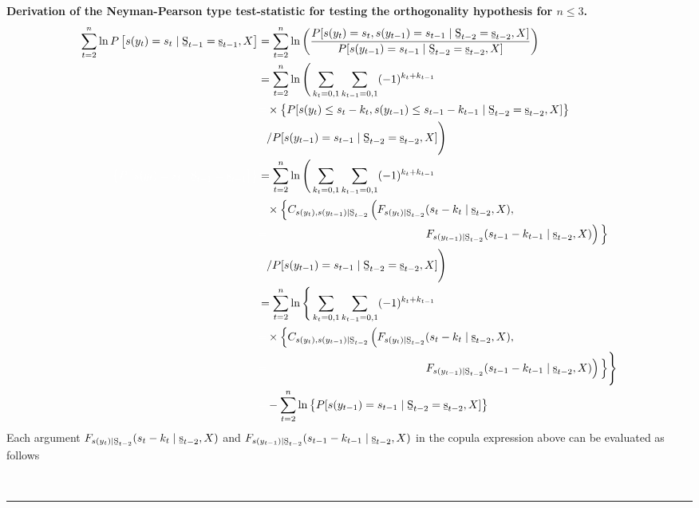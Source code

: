 \documentclass[harvard,11pt]{article}
\newenvironment{proof}[1][Proof]{\textbf{#1.} }{\  \rule{0.5em}{0.5em}}
\begin{document}
\begin{proof}[Derivation of the Neyman-Pearson type test-statistic for testing the orthogonality hypothesis for $n\leq 3$]
\begin{align*}
 \sum\limits_{t=2}^{n} \ln P\left[s(y_{t})=s_{t}\mid \text{\b{S}}_{t-1}=\text{\b{s}}_{t-1},X\right] &=\sum\limits_{t=2}^{n}\ln\left(\frac{P[s(y_t)=s_t,s(y_{t-1})=s_{t-1}\mid \text{\b{S}}%
_{t-2}=\text{\b{s}}%
_{t-2},X]}{P[s(y_{t-1})=s_{t-1}\mid \text{\b{S}}%
_{t-2}=\text{\b{s}}%
_{t-2},X]}\right)\\
&=\sum\limits_{t=2}^{n}\ln\Bigg(\sum\limits_{k_t=0,1}\sum\limits_{k_{t-1}=0,1}(-1)^{k_t+k_{t-1}}\\
&\textcolor{white}{=}\times\left\{P[s(y_t)\leq s_t-k_t,s(y_{t-1})\leq s_{t-1}-k_{t-1}\mid \text{\b{S}}%
_{t-2}=\text{\b{s}}_{t-2},X]\right\}\\
&\textcolor{white}{=}/P[s(y_{t-1})=s_{t-1}\mid \text{\b{S}}_{t-2}=\text{\b{s}}_{t-2},X]\Bigg)\\
\textcolor{white}{\left\{ P\left[s(y_{t})=s_{t}\mid \text{\b{S}}_{t-1}=\text{\b{s}}_{t-1}\right] \right\} }&=\sum\limits_{t=2}^{n}\ln\Bigg(\sum\limits_{k_t=0,1}\sum\limits_{k_{t-1}=0,1}(-1)^{k_t+k_{t-1}}\\
& \textcolor{white}{=}\times\Big\{C_{s(y_t),s(y_{t-1})\mid \text{\b{S}}%
_{t-2}}\left(F_{s(y_t)\mid \text{\b{S}}%
_{t-2} }(s_t-k_t\mid \text{\b{s}}%
_{t-2},X),\right.\\
& \textcolor{white}{=}\hspace{14em}\left.F_{s(y_{t-1})\mid \text{\b{S}}_{t-2}}(s_{t-1}-k_{t-1}\mid \text{\b{s}}_{t-2},X)\right)\Big\}\\
&\textcolor{white}{=}/P[s(y_{t-1})=s_{t-1}\mid \text{\b{S}}_{t-2}=\text{\b{s}}_{t-2},X]\Bigg)\\
&=\sum\limits_{t=2}^{n}\ln\Bigg\{\sum\limits_{k_t=0,1}\sum\limits_{k_{t-1}=0,1}(-1)^{k_t+k_{t-1}} \\
&\textcolor{white}{=} \times\Big\{C_{s(y_t),s(y_{t-1})\mid \text{\b{S}}%
_{t-2}}\left(F_{s(y_t)\mid \text{\b{S}}%
_{t-2} }(s_t-k_t\mid \text{\b{s}}%
_{t-2},X),\right.\\
& \textcolor{white}{=}\hspace{14em}\left.F_{s(y_{t-1})\mid \text{\b{S}}%
_{t-2}}(s_{t-1}-k_{t-1}\mid \text{\b{s}}%
_{t-2},X)\right)\Big\}\Bigg\}\\
&\textcolor{white}{=}-\sum\limits_{t=2}^{n}\ln\left\{P[s(y_{t-1})=s_{t-1}\mid \text{\b{S}}_{t-2}=\text{\b{s}}_{t-2},X]\right\}
\end{align*}%
\endgroup
Each argument $F_{s(y_t)\mid \text{\b{S}}%
_{t-2}}(s_t-k_t\mid \text{\b{s}}%
_{t-2},X)$ and $F_{s(y_{t-1})\mid \text{\b{S}}%
_{t-2}}(s_{t-1}-k_{t-1}\mid \text{\b{s}}%
_{t-2},X)$ in the copula expression above can be evaluated as follows

\end{proof}
\end{document}
